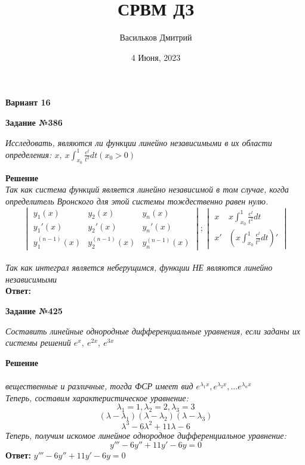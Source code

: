 \documentclass{article}
\title{СРВМ ДЗ}
\author{Васильков Дмитрий}
\date{4 Июня, 2023}
\begin{document}
\maketitle
\begin{center}
    \textbf{Вариант 16\\}
\end{center}

\begin{flushleft}
\textbf{Задание №386\\}
\end{flushleft}

\begin{flushleft}
\textsl{Исследовать, являются ли функции линейно независимыми в их области определения: $x, \ x \int_{x_0}^{1} \frac{e^t}{t^2}dt (x_0 > 0)$}
\end{flushleft}

\begin{flushleft}
    \textbf{Решение}\\
    \textsl{Так как система функций является линейно независимой в том случае, когда определитель Вронского для этой системы тождественно равен нулю.
    $$\begin{vmatrix}y_1(x) & y_2(x) & y_n(x) \\ y_1'(x) & y_2'(x) & y_n'(x) \\ y_1^{(n - 1)}(x) & y_2^{(n - 1)}(x) & y_n^{(n - 1)}(x) \end{vmatrix}; \begin{vmatrix} x & x \int_{x_0}^{1} \frac{e^t}{t^2}dt\\ x' & (x \int_{x_0}^{1} \frac{e^t}{t^2}dt)'\end{vmatrix}$$
    }\\
    \textsl{Так как интеграл является неберущимся, функции НЕ являются линейно независимыми}\\
    \textbf{Ответ:}
\end{flushleft}

\begin{flushleft}
\textbf{Задание №425}
\end{flushleft}

\begin{flushleft}
\textsl{Составить линейные однородные дифференциальные уравнения, если заданы их системы решений $e^{x}, \ e^{2x}, \ e^{3x}$}
\end{flushleft}

\begin{flushleft}
    \textbf{Решение}\\\\
    \textsl{вещественные и различные, тогда ФСР имеет вид $e^{\lambda_1 x}, e^{\lambda_2 x}, ... e^{\lambda_n x}$}\\
    \textsl{Теперь, составим характеристическое уравнение:
    $$\lambda_1 = 1, \lambda_2 = 2, \lambda_3 = 3$$
    $$(\lambda - \lambda_1)(\lambda - \lambda_2)(\lambda - \lambda_3)$$
    $$\lambda^3 - 6\lambda^2 + 11\lambda - 6$$}
    \textsl{Теперь, получим искомое линейное однородное дифференциальное уравнение:
    $$y''' - 6y'' + 11y' - 6y = 0$$}
    \textbf{Ответ: }
    \textsl{$y''' - 6y'' + 11y' - 6y = 0$}
\end{flushleft}
\end{document}
